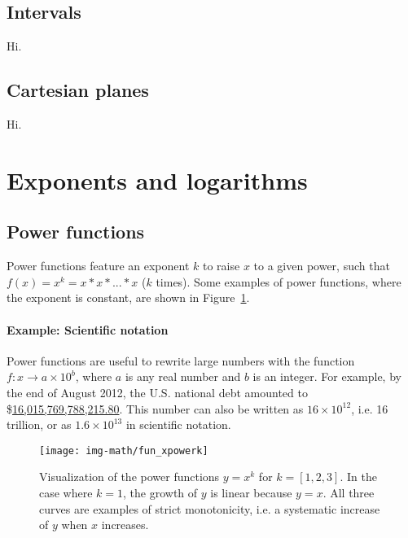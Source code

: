 \subsection{Intervals}%
%
Hi.

\subsection{Cartesian planes}%
%
Hi.

\section{Exponents and logarithms}

\subsection{Power functions}

Power functions feature an exponent $k$ to raise $x$ to a given power, such that $f(x) = x^k = x*x*...*x$ ($k$ times). Some examples of power functions, where the exponent is constant, are shown in Figure~\ref{fig:fun_xpowerk}.

\paragraph{Example: Scientific notation}%
%
Power functions are useful to rewrite large numbers with the function $f: x \to a \times 10^b$, where $a$ is any real number and $b$ is an integer. For example, by the end of August 2012, the U.S. national debt amounted to \$\href{http://www.treasurydirect.gov/NP/BPDLogin?application=np}{16,015,769,788,215.80}. This number can also be written as $16 \times 10^{12}$, i.e. 16 trillion, or as \ensuremath{1.6\times 10^{13}} in scientific notation.

\begin{knitrout}
\color{fgcolor}\begin{figure}[]

\texttt{[image: img-math/fun\_xpowerk]} \caption{Visualization of the power functions $y = x^k$ for $k = [1,2,3]$. In the case where $k = 1$, the growth of $y$ is linear because $y = x$. All three curves are examples of strict monotonicity, i.e. a systematic increase of $y$ when $x$ increases.\label{fig:fun_xpowerk}}
\end{figure}


\end{knitrout}


